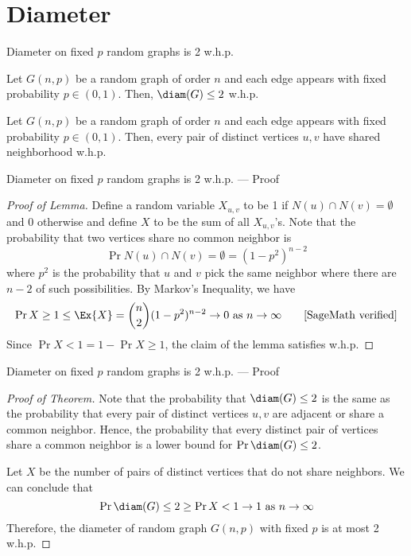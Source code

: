 \section{Diameter}

\begin{frame}{Diameter on fixed $p$ random graphs is 2 w.h.p.}
    \begin{theorem}
        Let \(G(n, p)\) be a random graph of order $n$ and each edge appears with fixed probability $p \in (0, 1)$. 
        Then, \(\diam(G) \leq 2\) w.h.p.
    \end{theorem}

    \begin{lemma}
        Let \(G(n, p)\) be a random graph of order $n$ and each edge appears with fixed probability $p \in (0, 1)$. 
        Then, every pair of distinct vertices $u, v$ have shared neighborhood w.h.p.
    \end{lemma}
\end{frame}

\begin{frame}{Diameter on fixed $p$ random graphs is 2 w.h.p. --- Proof}
    \begin{proof}[Proof of Lemma]
        Define a random variable $X_{u, v}$ to be 1 if $N(u) \cap N(v) = \emptyset$ and 0 otherwise and define $X$ to be the sum of all $X_{u, v}$'s. Note that the probability that two vertices share no common neighbor is
        \[ \Pr{N(u) \cap N(v) = \emptyset} = (1-p^2)^{n-2} \]
        where $p^2$ is the probability that $u$ and $v$ pick the same neighbor where there are $n-2$ of such possibilities.
        By Markov's Inequality, we have
        \[
        \begin{aligned}
            \Pr{X \geq 1} \leq \Ex{X}
                          = \binom{n}{2}(1-p^2)^{n-2} \to 0 \text{ as } n \to \infty \qquad \text{[SageMath verified]}
        \end{aligned}
        \]
        Since $\Pr{X < 1} = 1 - \Pr{X \geq 1}$, the claim of the lemma satisfies w.h.p.
    \end{proof}
\end{frame}

\begin{frame}{Diameter on fixed $p$ random graphs is 2 w.h.p. --- Proof}
    \begin{proof}[Proof of Theorem]
        Note that the probability that $\diam(G) \leq 2$ is the same as the probability that every pair of distinct vertices $u, v$ are adjacent or share a common neighbor. Hence, the probability that every distinct pair of vertices share a common neighbor is a lower bound for $\Pr{\diam(G) \leq 2}$.

        Let $X$ be the number of pairs of distinct vertices that do not share neighbors. We can conclude that
        \[ \Pr{\diam(G) \leq 2} \geq \Pr{X < 1} \to 1 \text{ as } n \to \infty \]
        Therefore, the diameter of random graph $G(n, p)$ with fixed $p$ is at most 2 w.h.p.
    \end{proof}
\end{frame}